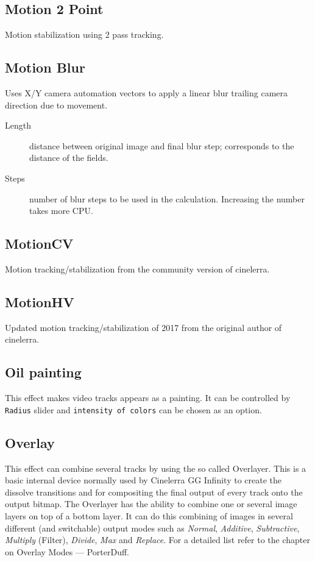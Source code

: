 \subsection{Motion 2 Point}%
\label{sub:motion_2_point}

Motion stabilization using 2 pass tracking.

\subsection{Motion Blur}%
\label{sub:motion_blur}

Uses X/Y camera automation vectors to apply a linear blur trailing camera direction due to movement.
\begin{description}
    \item[Length] distance between original image and final blur step; corresponds to the distance of the fields.
    \item[Steps] number of blur steps to be used in the calculation. Increasing the number takes more CPU.
\end{description}

\subsection{MotionCV}%
\label{sub:motioncv}

Motion tracking/stabilization from the community version of cinelerra.

\subsection{MotionHV}%
\label{sub:motionhv}

Updated motion tracking/stabilization of 2017 from the original author of cinelerra.

\subsection{Oil painting}%
\label{sub:oil_painting}

This effect makes video tracks appears as a painting. It can be controlled by \texttt{Radius} slider and \texttt{intensity of colors} can be chosen as an option.

\subsection{Overlay}%
\label{sub:overlay}

This effect can combine several tracks by using the so called Overlayer. This is a basic internal device normally used by Cinelerra GG Infinity to create the dissolve transitions and for compositing the final output of every track onto the output bitmap. The Overlayer has the ability to combine one or several image layers on top of a bottom layer. It can do this combining of images in several different (and switchable) output modes such as \textit{Normal}, \textit{Additive}, \textit{Subtractive}, \textit{Multiply} (Filter), \textit{Divide}, \textit{Max} and \textit{Replace}. For a detailed list refer to the chapter on Overlay Modes
--- PorterDuff.

